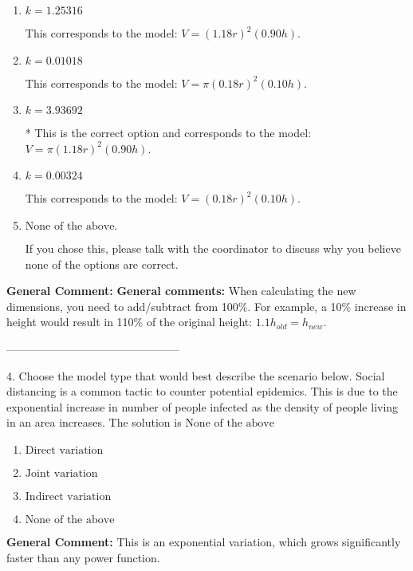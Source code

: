 \documentclass{extbook}[14pt]
\begin{document}
\begin{enumerate}[label=\Alph*.] 
\item $ k = 1.25316 $ 

 This corresponds to the model: $V = (1.18 r)^2 (0.90 h)$. 
\item $ k = 0.01018 $ 

 This corresponds to the model: $V = \pi (0.18 r)^2 (0.10 h)$. 
\item $ k = 3.93692 $ 

 * This is the correct option and corresponds to the model: $V = \pi (1.18 r)^2 (0.90 h)$. 
\item $ k = 0.00324 $ 

 This corresponds to the model: $V = (0.18 r)^2 (0.10 h)$. 
\item $ \text{None of the above.} $ 

 If you chose this, please talk with the coordinator to discuss why you believe none of the options are correct. 
\end{enumerate} 
 
\textbf{General Comment:} \textbf{General comments:} When calculating the new dimensions, you need to add/subtract from 100\%. For example, a 10\% increase in height would result in 110\% of the original height: $1.1h_{old} = h_{new}$. 

-----------------------------------------------

4. Choose the model type that would best describe the scenario below.
Social distancing is a common tactic to counter potential epidemics. This is due to the exponential increase in number of people infected as the density of people living in an area increases. 
The solution is $ \text{None of the above} $ 

\begin{enumerate}[label=\Alph*.] 
\item $ \text{Direct variation} $ 

  
\item $ \text{Joint variation} $ 

  
\item $ \text{Indirect variation} $ 

  
\item $ \text{None of the above} $ 

  
\end{enumerate} 
 
\textbf{General Comment:} This is an exponential variation, which grows significantly faster than any power function. 
\end{document}
